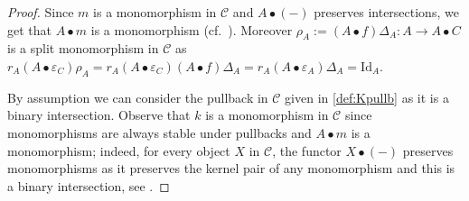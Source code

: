 \documentclass[nosumlimits,twoside]{amsart}
\theoremstyle{definition}
\theoremstyle{remark}
\newcommand{\Cc}{\mathcal{C}}
\begin{document}
\begin{proof}
Since $m$ is a monomorphism in $\Cc$ and $A\bullet \left( -\right) $ preserves
intersections, we get that $A\bullet m$ is a monomorphism (cf.\ \cite[Proposition
2.5.6]{BorI94}). Moreover $\rho _{A}:=\left( A\bullet f\right)
\Delta _{A}:A\to A\bullet C$ is a  split monomorphism in $\Cc$ as $r_{A}\left( A\bullet
\varepsilon _{C}\right) \rho _{A}=r_{A}\left( A\bullet \varepsilon _{C}\right) \left( A\bullet f\right)
\Delta _{A}=r_{A}\left( A\bullet \varepsilon
_{A}\right) \Delta _{A}=\mathrm{Id}_{A}$.

By assumption we can consider the pullback in $\mathcal{C}$ given in \eqref{def:Kpullb}
as it is a binary intersection. Observe that $k$ is a monomorphism in $\Cc$ since monomorphisms are always stable under pullbacks and $A\bullet m$ is a
monomorphism; indeed, for every object $X$ in $\Cc$, the functor $X\bullet (-)$ preserves monomorphisms as it preserves the kernel pair of any monomorphism and this is a binary intersection, see \cite[Proposition 2.5.6]{BorI94}.


\end{proof}
\end{document}
